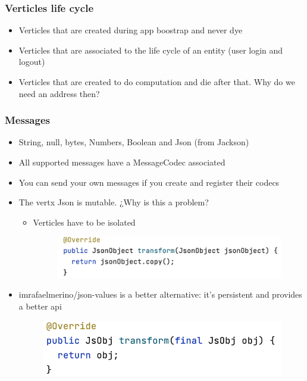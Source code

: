 \documentclass{beamer}
\begin{document}
\begin{frame}
\frametitle{Verticles life cycle}
\begin{itemize}
\item<1-> Verticles that are created during app boostrap and never dye
\item<2-> Verticles that are associated to the life cycle of an entity (user login and logout)
\item<3-> Verticles that  are created to do computation and die after that. Why do we need an address then?
\end{itemize}
\end{frame}

\begin{frame}
\frametitle{Messages}
\begin{itemize}
\item<1-> String, null, bytes, Numbers, Boolean and Json (from Jackson)
\item<2-> All supported messages have a MessageCodec associated
\item<3-> You can send your own messages if you create and register their codecs
\item<4-> The vertx Json is mutable. ¿Why is this a problem?
\begin{itemize}
\item<5-> Verticles have to be isolated
\newline
\begin{figure}
\includegraphics[scale=0.5]{images/vertx-json-codec.png}
\end{figure}
\end{itemize}
\item<6->  imrafaelmerino/json-values is a better alternative: it's persistent and provides a better api
\newline
\begin{figure}
\includegraphics[scale=0.5]{images/jsvalues-codec.png}
\end{figure}
\end{itemize}
\end{frame}
\end{document}
